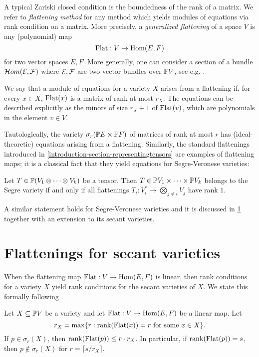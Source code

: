 A typical Zariski closed condition is the boundedness of the rank of a matrix. We refer to \emph{flattening method} for any method which yields modules of equations via rank condition on a matrix. More precisely, a \emph{generalized flattening} of a space $V$ is any (polynomial) map 
\[
\mathrm{Flat} : V \to \operatorname{Hom} ( E,F)
\]
for two vector spaces $E,F$. More generally, one can consider a section of a bundle $\mathcal{H}om(\mathcal{E},\mathcal{F})$ where $\mathcal{E},\mathcal{F}$ are two vector bundles over $\mathbb{P} V$, see e.g. \cite{EH88}.

We say that a module of equations for a variety $X$ arises from a flattening if, for every $x \in X$, $\mathrm{Flat}(x)$ is a matrix of rank at most $r_X$. The equations can be described explicitly as the minors of size $r_X+1$ of $\mathrm{Flat}(v)$, which are polynomials in the element $v \in V$.

Tautologically, the variety $\sigma_r( \mathbb{P} E \times \mathbb{P} F)$ of matrices of rank at most $r$ has (ideal-theoretic) equations arising from a flattening. Similarly, the standard flattenings introduced in \ref{introduction-section-representingtensors} are examples of flattening maps; it is a classical fact that they yield equations for Segre-Veronese varieties:
\begin{proposition}
\label{RepTheory-proposition-standardFlatrank1}
 Let $T \in \mathbb{P} (V_1 \otimes \cdots \otimes V_k)$ be a tensor. Then $T \in \mathbb{P} V_1 \times \cdots \times \mathbb{P} V_k$ belongs to the Segre variety if and only if all flattenings $T_i : V_i^* \to \bigotimes _{j \neq i} V_j$ have rank $1$.
\end{proposition}
A similar statement holds for Segre-Veronese varieties and it is discussed in \ref{RepTheory-section-flatteningsSecants} together with an extension to its secant varieties.

\section{Flattenings for secant varieties}
\label{RepTheory-section-flatteningsSecants}

When the flattening map $\mathrm{Flat} : V \to \operatorname{Hom}(E,F)$ is linear, then rank conditions for a variety $X$ yield rank conditions for the secant varieties of $X$. We state this formally following \cite[Prop. 4.1.1]{LO13}.
\begin{lemma}
 \label{RepTheory-lemma-LandsbergOttaviani411}
 Let $X \subseteq \mathbb{P} V$ be a variety and let $\mathrm{Flat} : V \to \operatorname{Hom}(E,F)$ be a linear map. Let 
 \[
 r_X = \max \{ r : \mathrm{rank} ( \mathrm{Flat}(x)) = r \text{ for some $x \in X$}\}.
 \]
If $p \in \sigma_r(X)$, then $\mathrm{rank}(\mathrm{Flat}(p)) \leq r \cdot r_X$. In particular, if $\mathrm{rank}(\mathrm{Flat}(p)) = s$, then $p \notin \sigma_r (X)$ for $r = \lceil s / r_X \rceil$.
\end{lemma}

